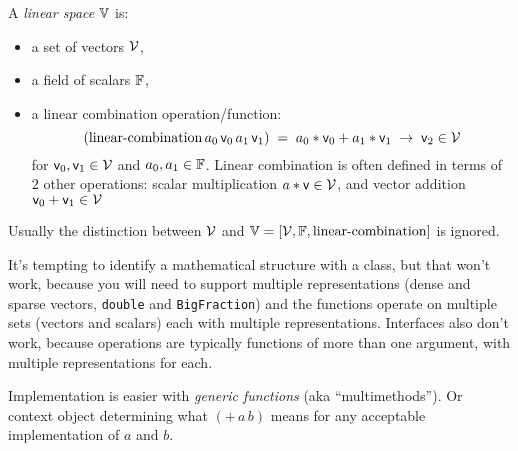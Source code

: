 \begin{example}
\bigskip
A \textit{linear space} $\mathbb{V}$ is:
\begin{itemize}
  \item a set of vectors $\mathcal{V}$,
  \item a field of scalars $\mathbb{F}$,
  \item a linear combination operation/function: 
\begin{equation}
\left( \text{linear-combination} 
\, a_0 \, \mathsf{v}_0 \, a_1 \, \mathsf{v}_1 \right) \; 
= \; a_0*\mathsf{v}_0 + a_1*\mathsf{v}_1
\; \rightarrow \; \mathsf{v}_2  \in \mathcal{V}
\end{equation}
for $\mathsf{v}_0, \mathsf{v}_1 \in \mathcal{V} $
and $a_0, a_1 \in \mathbb{F}$.
Linear combination is often defined in terms of
$2$ other operations:
scalar multiplication $a * \mathsf{v} \in \mathcal{V}$,
and vector addition $\mathsf{v}_0 + \mathsf{v}_1 \in \mathcal{V}$
\end{itemize}
Usually the distinction between $\mathcal{V}$ and 
$\mathbb{V} = \left[ \mathcal{V}, \mathbb{F}, \text{linear-combination} \right]$
is ignored.
\end{example}

It's tempting to identify a mathematical structure with a class,
but that won't work, because you will need to support multiple
representations (dense and sparse vectors, \texttt{double}
and \texttt{BigFraction}) and the functions
operate on multiple sets (vectors and scalars)
each with multiple representations.
Interfaces also don't work, because 
operations are typically functions of more than one argument,
with multiple representations for each.

Implementation is easier with \textit{generic functions}
(aka ``multimethods'').
Or context object determining what $\left(+ \, a \, b \right)$
means for any acceptable implementation of $a$ and $b$.

\setcounter{currentlevel}{\value{baseSectionLevel}}

\setcounter{currentlevel}{\value{baseSectionLevel}}

\setcounter{currentlevel}{\value{baseSectionLevel}}

\setcounter{currentlevel}{\value{baseSectionLevel}}

\setcounter{currentlevel}{\value{baseSectionLevel}}

\setcounter{currentlevel}{\value{baseSectionLevel}}

\setcounter{currentlevel}{\value{baseSectionLevel}}

